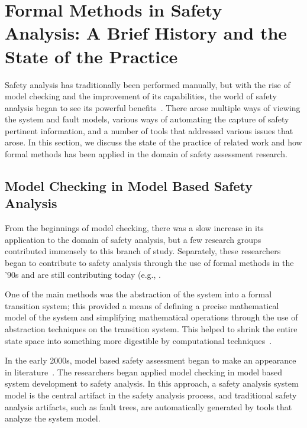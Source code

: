 \section{Formal Methods in Safety Analysis: A Brief History and the State of the Practice}
\label{sec:modelCheckingInSA}
Safety analysis has traditionally been performed manually, but with the rise of model checking and the improvement of its capabilities, the world of safety analysis began to see its powerful benefits~\cite{hinchey2012industrial, liggesmeyer1998improving, coudert1993fault, Bozzano:2010:DSA:1951720,bozzano2003esacs}. There arose multiple ways of viewing the system and fault models, various ways of automating the capture of safety pertinent information, and a number of tools that addressed various issues that arose. In this section, we discuss the state of the practice of related work and how formal methods has been applied in the domain of safety assessment research.

\subsection{Model Checking in Model Based Safety Analysis}
From the beginnings of model checking, there was a slow increase in its application to the domain of safety analysis, but a few research groups contributed immensely to this branch of study. Separately, these researchers began to contribute to safety analysis through the use of formal methods in the '90s and are still contributing today (e.g., \cite{reese1997software,signoret1998altarica,chiappini1999formal,cimatti2000industrial}. 

One of the main methods was the abstraction of the system into a formal transition system; this provided a means of defining a precise mathematical model of the system and simplifying mathematical operations through the use of abstraction techniques on the transition system. This helped to shrink the entire state space into something more digestible by computational techniques~\cite{d2008survey}. 

In the early 2000s, model based safety assessment began to make an appearance in literature~\cite{Bozzano:2010:DSA:1951720,Joshi05:Dasc, Joshi05:SafeComp, Joshi07:Hase}. The researchers began applied model checking in model based system development to safety analysis.  In this approach, a safety analysis system model is the central artifact in the safety analysis process, and traditional safety analysis artifacts, such as fault trees, are automatically generated by tools that analyze the system model.

